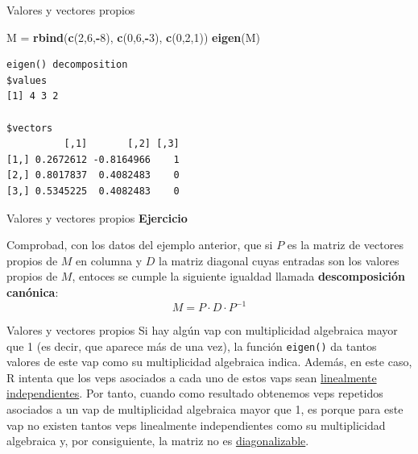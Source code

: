 \documentclass[
  ignorenonframetext,
]{beamer}
\newenvironment{Shaded}{\begin{snugshade}}{\end{snugshade}}
\newcommand{\DecValTok}[1]{\textcolor[rgb]{0.00,0.00,0.81}{#1}}
\newcommand{\FunctionTok}[1]{\textcolor[rgb]{0.13,0.29,0.53}{\textbf{#1}}}
\newcommand{\NormalTok}[1]{#1}
\newcommand{\OtherTok}[1]{\textcolor[rgb]{0.56,0.35,0.01}{#1}}
\newcommand{\SpecialCharTok}[1]{\textcolor[rgb]{0.81,0.36,0.00}{\textbf{#1}}}
\begin{document}
\begin{frame}[fragile]{Valores y vectores propios}
\label{valores-y-vectores-propios-1}
\begin{Shaded}
\begin{Highlighting}[]
\NormalTok{M }\OtherTok{=} \FunctionTok{rbind}\NormalTok{(}\FunctionTok{c}\NormalTok{(}\DecValTok{2}\NormalTok{,}\DecValTok{6}\NormalTok{,}\SpecialCharTok{{-}}\DecValTok{8}\NormalTok{), }\FunctionTok{c}\NormalTok{(}\DecValTok{0}\NormalTok{,}\DecValTok{6}\NormalTok{,}\SpecialCharTok{{-}}\DecValTok{3}\NormalTok{), }\FunctionTok{c}\NormalTok{(}\DecValTok{0}\NormalTok{,}\DecValTok{2}\NormalTok{,}\DecValTok{1}\NormalTok{))}
\FunctionTok{eigen}\NormalTok{(M)}
\end{Highlighting}
\end{Shaded}

\begin{verbatim}
eigen() decomposition
$values
[1] 4 3 2

$vectors
          [,1]       [,2] [,3]
[1,] 0.2672612 -0.8164966    1
[2,] 0.8017837  0.4082483    0
[3,] 0.5345225  0.4082483    0
\end{verbatim}
\end{frame}

\begin{frame}{Valores y vectores propios}
\label{valores-y-vectores-propios-2}
\textbf{Ejercicio}

Comprobad, con los datos del ejemplo anterior, que si \(P\) es la matriz
de vectores propios de \(M\) en columna y \(D\) la matriz diagonal cuyas
entradas son los valores propios de \(M\), entoces se cumple la
siguiente igualdad llamada \textbf{descomposición canónica}:
\[M = P\cdot D\cdot P^{-1}\]
\end{frame}

\begin{frame}[fragile]{Valores y vectores propios}
\label{valores-y-vectores-propios-3}
Si hay algún vap con multiplicidad algebraica mayor que 1 (es decir, que
aparece más de una vez), la función \texttt{eigen()} da tantos valores
de este vap como su multiplicidad algebraica indica. Además, en este
caso, R intenta que los veps asociados a cada uno de estos vaps sean
\href{https://es.wikipedia.org/wiki/Dependencia_e_independencia_lineal}{linealmente
independientes}. Por tanto, cuando como resultado obtenemos veps
repetidos asociados a un vap de multiplicidad algebraica mayor que 1, es
porque para este vap no existen tantos veps linealmente independientes
como su multiplicidad algebraica y, por consiguiente, la matriz no es
\href{https://es.wikipedia.org/wiki/Matriz_diagonalizable}{diagonalizable}.
\end{frame}
\end{document}
